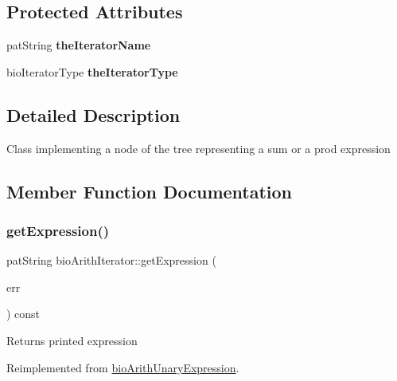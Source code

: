 \subsection*{Protected Attributes}
\begin{DoxyCompactItemize}
\item 
\mbox{\label{classbio_arith_iterator_a44e87dc91e2382f8ab09346eb1be8cb0}} 
pat\+String {\bfseries the\+Iterator\+Name}
\item 
\mbox{\label{classbio_arith_iterator_a0338b170a0f40968c6f7e4f23231bf40}} 
bio\+Iterator\+Type {\bfseries the\+Iterator\+Type}
\end{DoxyCompactItemize}


\subsection{Detailed Description}
Class implementing a node of the tree representing a sum or a prod expression 

\subsection{Member Function Documentation}
\mbox{\label{classbio_arith_iterator_aceb6ee1a4c024349178de5edf4624710}} 
\subsubsection{\texorpdfstring{get\+Expression()}{getExpression()}}
{\footnotesize\ttfamily pat\+String bio\+Arith\+Iterator\+::get\+Expression (\begin{DoxyParamCaption}\item[{pat\+Error $\ast$\&}]{err }\end{DoxyParamCaption}) const\hspace{0.3cm}{\ttfamily [virtual]}}

\begin{DoxyReturn}{Returns}
printed expression 
\end{DoxyReturn}


Reimplemented from \hyperlink{classbio_arith_unary_expression_a974b7779804861f331a75e08db377926}{bio\+Arith\+Unary\+Expression}.

